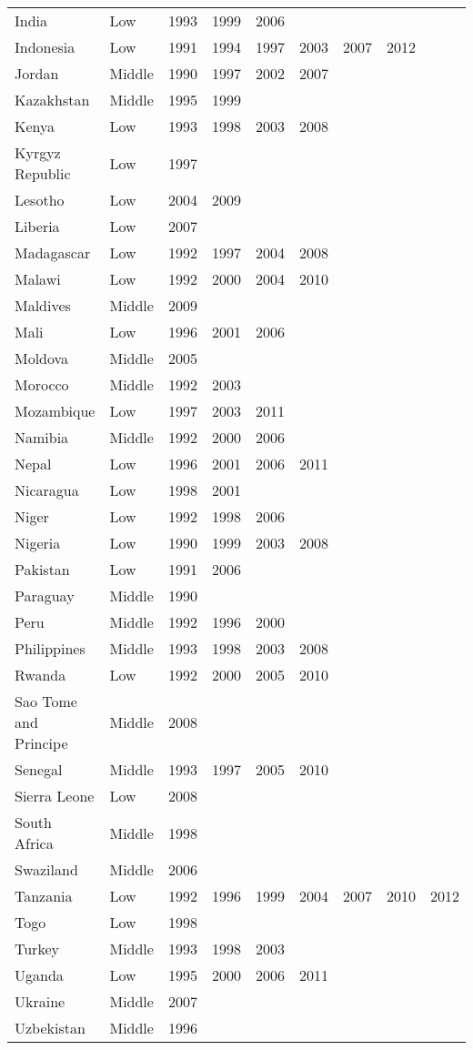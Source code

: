 \begin{spacing}{1}
\begin{longtable}{llccccccc}
India&Low&1993&1999&2006&&&&\\
Indonesia&Low&1991&1994&1997&2003&2007&2012&\\
Jordan&Middle&1990&1997&2002&2007&&&\\
Kazakhstan&Middle&1995&1999&&&&&\\
Kenya&Low&1993&1998&2003&2008&&&\\
Kyrgyz Republic&Low&1997&&&&&&\\
Lesotho&Low&2004&2009&&&&&\\
Liberia&Low&2007&&&&&&\\
Madagascar&Low&1992&1997&2004&2008&&&\\
Malawi&Low&1992&2000&2004&2010&&&\\
Maldives&Middle&2009&&&&&&\\
Mali&Low&1996&2001&2006&&&&\\
Moldova&Middle&2005&&&&&&\\
Morocco&Middle&1992&2003&&&&&\\
Mozambique&Low&1997&2003&2011&&&&\\
Namibia&Middle&1992&2000&2006&&&&\\
Nepal&Low&1996&2001&2006&2011&&&\\
Nicaragua&Low&1998&2001&&&&&\\
Niger&Low&1992&1998&2006&&&&\\
Nigeria&Low&1990&1999&2003&2008&&&\\
Pakistan&Low&1991&2006&&&&&\\
Paraguay&Middle&1990&&&&&&\\
Peru&Middle&1992&1996&2000&&&&\\
Philippines&Middle&1993&1998&2003&2008&&&\\
Rwanda&Low&1992&2000&2005&2010&&&\\
Sao Tome and Principe&Middle&2008&&&&&&\\
Senegal&Middle&1993&1997&2005&2010&&&\\
Sierra Leone&Low&2008&&&&&&\\
South Africa&Middle&1998&&&&&&\\
Swaziland&Middle&2006&&&&&&\\
Tanzania&Low&1992&1996&1999&2004&2007&2010&2012\\
Togo&Low&1998&&&&&&\\
Turkey&Middle&1993&1998&2003&&&&\\
Uganda&Low&1995&2000&2006&2011&&&\\
Ukraine&Middle&2007&&&&&&\\
Uzbekistan&Middle&1996&&&&&&\\

\end{longtable}
\end{spacing}
